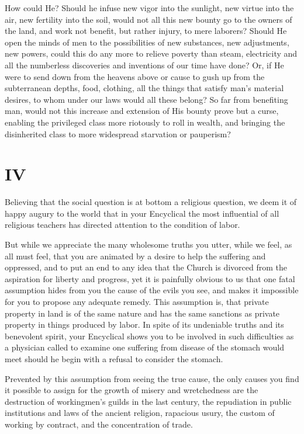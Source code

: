 \documentclass{book}
\begin{document}
How could He? Should he infuse new vigor into the sunlight, new virtue into the air, new fertility into the soil, would not all this new bounty go to the owners of the land, and work not benefit, but rather injury, to mere laborers? Should He open the minds of men to the possibilities of new substances, new adjustments, new powers, could this do any more to relieve poverty than steam, electricity and all the numberless discoveries and inventions of our time have done? Or, if He were to send down from the heavens above or cause to gush up from the subterranean depths, food, clothing, all the things that satisfy man’s material desires, to whom under our laws would all these belong? So far from benefiting man, would not this increase and extension of His bounty prove but a curse, enabling the privileged class more riotously to roll in wealth, and bringing the disinherited class to more widespread starvation or pauperism?

\chapter*{IV}
\label{chapter-4}
Believing that the social question is at bottom a religious question, we deem it of happy augury to the world that in your Encyclical the most influential of all religious teachers has directed attention to the condition of labor.

But while we appreciate the many wholesome truths you utter, while we feel, as all must feel, that you are animated by a desire to help the suffering and oppressed, and to put an end to any idea that the Church is divorced from the aspiration for liberty and progress, yet it is painfully obvious to us that one fatal assumption hides from you the cause of the evils you see, and makes it impossible for you to propose any adequate remedy. This assumption is, that private property in land is of the same nature and has the same sanctions as private property in things produced by labor. In spite of its undeniable truths and its benevolent spirit, your Encyclical shows you to be involved in such difficulties as a physician called to examine one suffering from disease of the stomach would meet should he begin with a refusal to consider the stomach.

Prevented by this assumption from seeing the true cause, the only causes you find it possible to assign for the growth of misery and wretchedness are the destruction of workingmen’s guilds in the last century, the repudiation in public institutions and laws of the ancient religion, rapacious usury, the custom of working by contract, and the concentration of trade.
\end{document}
